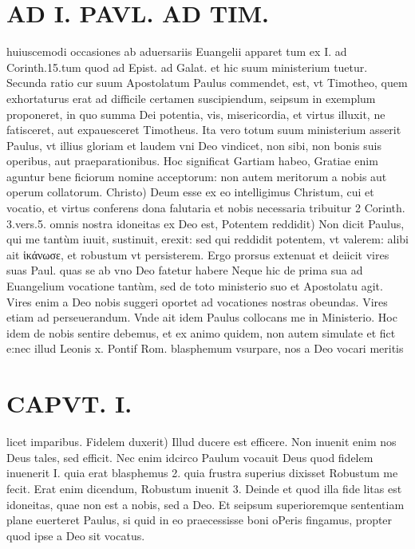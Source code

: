\documentclass{article}
\begin{document}
\begin{pages}
\section*{AD I. PAVL. AD TIM. }
\marginpar{[ p.24 ]}\pstart huiuscemodi occasiones ab aduersariis Euangelii apparet tum ex I. ad Corinth.15.tum quod ad Epist. ad Galat. et hic suum ministerium tuetur. Secunda ratio cur suum Apostolatum Paulus commendet, est, vt Timotheo, quem exhortaturus erat ad difficile certamen suscipiendum, seipsum in exemplum proponeret, in quo summa Dei potentia, vis, misericordia, et virtus illuxit, ne fatisceret, aut expauesceret Timotheus. Ita vero totum suum ministerium asserit Paulus, vt illius gloriam et laudem vni Deo vindicet, non sibi, non bonis suis operibus, aut praeparationibus. Hoc significat Gartiam habeo, Gratiae enim aguntur bene ficiorum nomine acceptorum: non autem meritorum a nobis aut operum collatorum. Christo) Deum esse ex eo intelligimus Christum, cui et vocatio, et virtus conferens dona falutaria et nobis necessaria tribuitur 2 Corinth. 3.vers.5. omnis nostra idoneitas ex Deo est,  \pend\pstart Potentem reddidit) Non dicit Paulus, qui me tantùm iuuit, sustinuit, erexit: sed qui reddidit potentem, vt valerem: alibi ait ἱκάνωσε, et robustum vt persisterem. Ergo prorsus extenuat et deiicit vires suas Paul. quas se ab vno Deo fatetur habere Neque hic de prima sua ad Euangelium vocatione tantùm, sed de toto ministerio suo et Apostolatu agit. Vires enim a Deo nobis suggeri oportet ad vocationes nostras obeundas. Vires etiam ad perseuerandum. Vnde ait idem Paulus collocans me in Ministerio. Hoc idem de nobis sentire debemus, et ex animo quidem, non autem simulate et fict e:nec illud Leonis x. Pontif Rom. blasphemum vsurpare, nos a Deo vocari meritis  \pend
\section*{CAPVT. I. }
\marginpar{[ p.25 ]}\pstart licet imparibus.  \pend\pstart Fidelem duxerit) Illud ducere est efficere. Non inuenit enim nos Deus tales, sed efficit. Nec enim idcirco Paulum vocauit Deus quod fidelem inuenerit I. quia erat blasphemus 2. quia frustra superius dixisset Robustum me fecit. Erat enim dicendum, Robustum inuenit 3. Deinde et quod illa fide litas est idoneitas, quae non est a nobis, sed a Deo. Et seipsum superioremque sententiam plane euerteret Paulus, si quid in eo praecessisse boni oPeris fingamus, propter quod ipse a Deo sit vocatus.  \pend
{}
{}

\end{pages}
\end{document}
